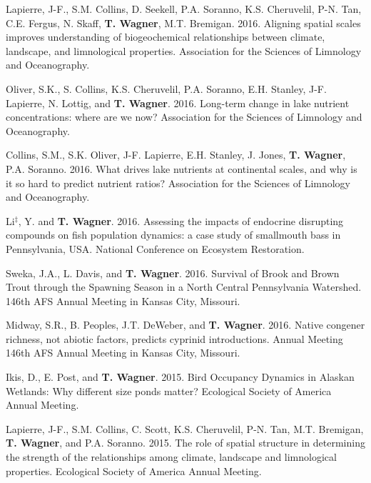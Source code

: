 \documentclass[10pt]{article}
\begin{document}
\begin{flushleft}
\begin{etaremune}
\item Lapierre, J-F., S.M. Collins, D. Seekell, P.A. Soranno, K.S. Cheruvelil, P-N. Tan, C.E. Fergus, N. Skaff,  {\bf T. Wagner}, M.T. Bremigan. 2016. Aligning spatial scales improves understanding of biogeochemical relationships between climate, landscape, and limnological properties. Association for the Sciences of Limnology and Oceanography.

\item Oliver, S.K., S. Collins, K.S. Cheruvelil, P.A. Soranno, E.H. Stanley, J-F. Lapierre, N. Lottig, and  {\bf T. Wagner}. 2016. Long-term change in lake nutrient concentrations: where are we now? Association for the Sciences of Limnology and Oceanography. 

\item Collins, S.M., S.K. Oliver, J-F. Lapierre, E.H. Stanley, J. Jones,  {\bf T. Wagner}, P.A. Soranno. 2016. What drives lake nutrients at continental scales, and why is it so hard to predict nutrient ratios? Association for the Sciences of Limnology and Oceanography. 

\item Li$^\ddagger$, Y. and  {\bf T. Wagner}. 2016. Assessing the impacts of endocrine disrupting compounds on fish population dynamics: a case study of smallmouth bass in Pennsylvania, USA. National Conference on Ecosystem Restoration. 

\item Sweka, J.A., L. Davis, and {\bf T. Wagner}. 2016. Survival of Brook and Brown Trout through the Spawning Season in a North Central Pennsylvania Watershed. 146th AFS Annual Meeting in Kansas City, Missouri.

\item Midway, S.R., B. Peoples, J.T. DeWeber, and {\bf T. Wagner}. 2016. Native congener richness, not abiotic factors, predicts cyprinid introductions. Annual Meeting 146th AFS Annual Meeting in Kansas City, Missouri. 


\item Ikis, D., E. Post, and {\bf T. Wagner}. 2015. Bird Occupancy Dynamics in Alaskan Wetlands: Why different size ponds matter?  Ecological Society of America Annual Meeting. 

\item Lapierre, J-F., S.M. Collins, C. Scott, K.S. Cheruvelil, P-N. Tan, M.T. Bremigan, {\bf T. Wagner}, and P.A. Soranno. 2015. The role of spatial structure in determining the strength of the relationships among climate, landscape and limnological properties. Ecological Society of America Annual Meeting.\\


\end{etaremune}
\end{flushleft}
\end{document}
